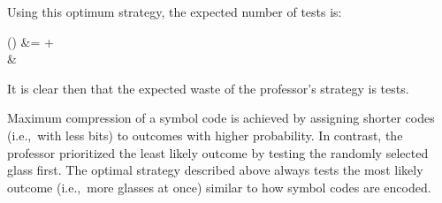 \noindent
Using this optimum strategy, the expected number of tests is:

\begin{aligncustom}
  () &=   +   \\
  &\approx {}
\end{aligncustom}

It is clear then that the expected waste of the professor's strategy is  tests.

Maximum compression of a symbol code is achieved by assigning shorter codes (i.e.,~with less bits) to outcomes with higher probability.  In contrast, the professor prioritized the least likely outcome by testing the randomly selected glass first.  The optimal strategy described above always tests the most likely outcome (i.e.,~more glasses at once) similar to how symbol codes are encoded.